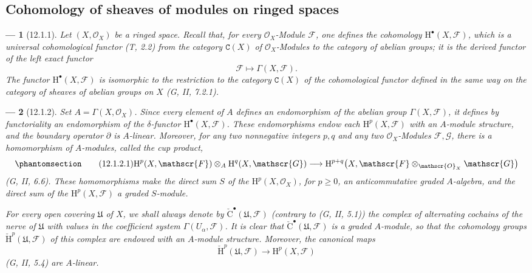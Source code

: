 \documentclass[oneside]{amsart}
\theoremstyle{ega-env-style}
\newtheorem*{env}{---}
\theoremstyle{ega-thm-env-style}
\theoremstyle{ega-defn-env-style}
\def\mathcal{\mathscr}
\def\sh{\mathcal}                   %
\def\cat{\mathtt}                   %
\def\geq{\geqslant}                 %
\def\HH{\mathrm{H}}                 %
\newcommand{\oldpage}[2][]{{\marginnote{\normalfont{\textbf{#1}~|~#2}}}\ignorespaces}
\let\EGAOriginalLabel\label
\renewcommand{\label}[1]{\phantomsection\EGAOriginalLabel{#1}}
\begin{document}
\subsection{Cohomology of sheaves of modules on ringed spaces}
\label{subsection:0.12.1}

\begin{env}[12.1.1]
\label{0.12.1.1}
\oldpage[0\textsubscript{III}]{49}
Let $(X,\sh{O}_X)$ be a ringed space.
Recall that, for every $\sh{O}_X$-Module $\sh{F}$, one defines the
cohomology $\HH^\bullet(X,\sh{F})$, which is a universal cohomological
functor (T, 2.2) from the category $\cat{C}(X)$ of
$\sh{O}_X$-Modules to the category of abelian groups; it is the derived
functor of the left exact functor
\[
  \sh{F}\longmapsto\Gamma(X,\sh{F}).
\]
The functor $\HH^\bullet(X,\sh{F})$ is isomorphic
\oldpage[0\textsubscript{III}]{50}
to the restriction to the category $\cat{C}(X)$ of the cohomological
functor defined in the same way on the category of sheaves of abelian
groups on $X$ (G, II, 7.2.1).
\end{env}

\begin{env}[12.1.2]
\label{0.12.1.2}
Set $A=\Gamma(X,\sh{O}_X)$.
Since every element of $A$ defines an endomorphism of the abelian group
$\Gamma(X,\sh{F})$, it defines by functoriality an endomorphism of the
$\delta$-functor $\HH^\bullet(X,\sh{F})$.
These endomorphisms endow each $\HH^p(X,\sh{F})$ with an
$A$-module structure, and the boundary operator $\partial$ is
$A$-linear.
Moreover, for any two nonnegative integers $p,q$ and any two
$\sh{O}_X$-Modules $\sh{F},\sh{G}$, there is a homomorphism of
$A$-modules, called the \emph{cup product},
\[
\label{0.12.1.2.1}
\tag{12.1.2.1}
  \HH^p(X,\sh{F})\otimes_A\HH^q(X,\sh{G})
  \longrightarrow
  \HH^{p+q}\bigl(X,\sh{F}\otimes_{\sh{O}_X}\sh{G}\bigr)
\]
(G, II, 6.6).
These homomorphisms make the direct sum $S$ of the
$\HH^p(X,\sh{O}_X)$, for $p\geq0$, an anticommutative graded
$A$-algebra, and the direct sum of the $\HH^p(X,\sh{F})$ a graded
$S$-module.

For every open covering $\mathfrak{U}$ of $X$, we shall always denote
by $\check{\mathrm{C}}^\bullet(\mathfrak{U},\sh{F})$ (contrary to
(G, II, 5.1)) the complex of alternating cochains of the nerve of
$\mathfrak{U}$ with values in the coefficient system
$\Gamma(U_\alpha,\sh{F})$.
It is clear that
$\check{\mathrm{C}}^\bullet(\mathfrak{U},\sh{F})$ is a graded
$A$-module, so that the cohomology groups
$\check{\HH}^p(\mathfrak{U},\sh{F})$ of this complex are endowed with
an $A$-module structure.
Moreover, the canonical maps
\[
  \check{\HH}^p(\mathfrak{U},\sh{F})
  \longrightarrow
  \HH^p(X,\sh{F})
\]
(G, II, 5.4) are $A$-linear.
\end{env}
\end{document}
